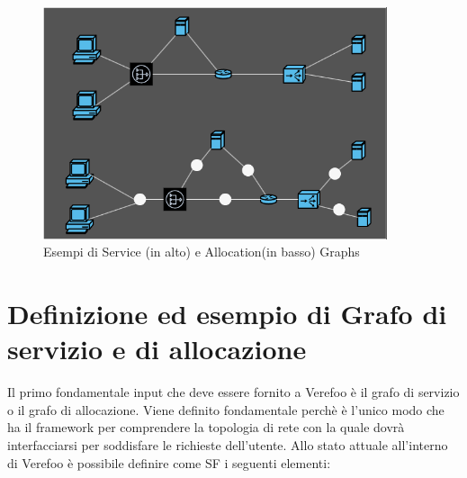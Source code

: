 \begin{figure}[H]  %
    \centering
    \includegraphics[width=0.9\textwidth]{Service_Allocation_Graph.png}  %
    \caption{Esempi di Service (in alto) e Allocation(in basso) Graphs \cite{Bringhenti2019}}
    \label{fig:AllocationGraph}
  \end{figure}



\section{Definizione ed esempio di Grafo di servizio e di allocazione}

Il primo fondamentale input che deve essere fornito a Verefoo è il grafo di servizio o il grafo di allocazione. 
Viene definito fondamentale perchè è l'unico modo che ha il framework per comprendere la topologia di rete con la quale dovrà interfacciarsi per soddisfare le richieste dell'utente.
Allo stato attuale all'interno di Verefoo è possibile definire come SF i seguenti elementi:

